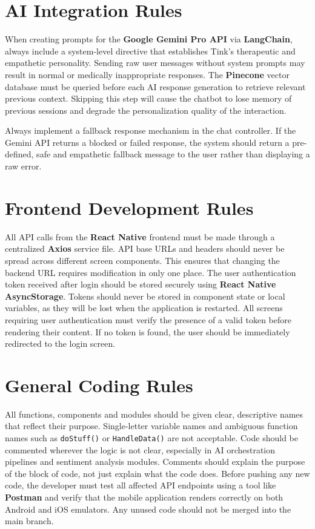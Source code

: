 \documentclass[a4paper,12pt]{report}
\begin{document}
\section{AI Integration Rules}
When creating prompts for the \textbf{Google Gemini Pro API} via \textbf{LangChain}, always include a system-level directive that establishes Tink's therapeutic and empathetic personality. Sending raw user messages without system prompts may result in normal or medically inappropriate responses.
The \textbf{Pinecone} vector database must be queried before each AI response generation to retrieve relevant previous context. Skipping this step will cause the chatbot to lose memory of previous sessions and degrade the personalization quality of the interaction.

Always implement a fallback response mechanism in the chat controller. If the Gemini API returns a blocked or failed response, the system should return a pre-defined, safe and empathetic fallback message to the user rather than displaying a raw error.

\section{Frontend Development Rules}
All API calls from the \textbf{React Native} frontend must be made through a centralized \textbf{Axios} service file. API base URLs and headers should never be spread across different screen components. This ensures that changing the backend URL requires modification in only one place.
The user authentication token received after login should be stored securely using \textbf{React Native AsyncStorage}. Tokens should never be stored in component state or local variables, as they will be lost when the application is restarted.
All screens requiring user authentication must verify the presence of a valid token before rendering their content. If no token is found, the user should be immediately redirected to the login screen.

\section{General Coding Rules}
All functions, components and modules should be given clear, descriptive names that reflect their purpose. Single-letter variable names and ambiguous function names such as \texttt{doStuff()} or \texttt{HandleData()} are not acceptable.
Code should be commented wherever the logic is not clear, especially in AI orchestration pipelines and sentiment analysis modules. Comments should explain the purpose of the block of code, not just explain what the code does.
Before pushing any new code, the developer must test all affected API endpoints using a tool like \textbf{Postman} and verify that the mobile application renders correctly on both Android and iOS emulators. Any unused code should not be merged into the main branch.



\nocite{*}
\end{document}
